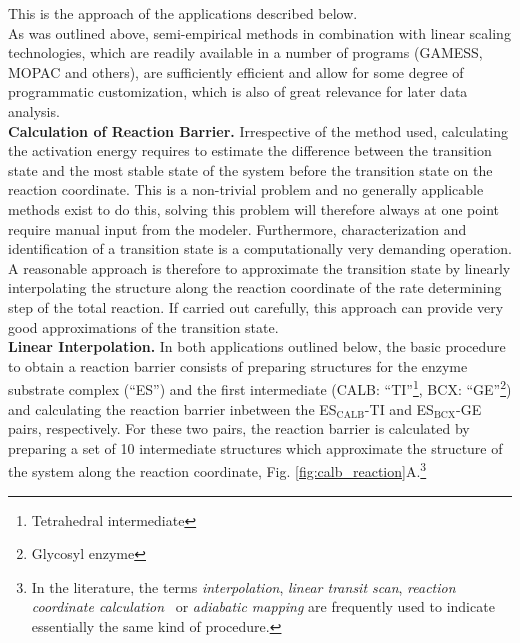 This is the approach of the applications described below.\\
As was outlined above, semi-empirical methods in combination with linear scaling technologies, which are readily available in a number of programs (GAMESS, MOPAC and others), are sufficiently efficient and allow for some degree of programmatic customization, which is also of great relevance for later data analysis.\\
\textbf{Calculation of Reaction Barrier.}
Irrespective of the method used, calculating the activation energy requires to estimate the difference between the transition state and the most stable state of the system before the transition state on the reaction coordinate.
This is a non-trivial problem and no generally applicable methods exist to do this, solving this problem will therefore always at one point require manual input from the modeler.
Furthermore, characterization and identification of a transition state is a computationally very demanding operation.
A reasonable approach is therefore to approximate the transition state by linearly interpolating the structure along the reaction coordinate of the rate determining step of the total reaction.
If carried out carefully, this approach can provide very good approximations of the transition state.\\
\textbf{Linear Interpolation.}
In both applications outlined below, the basic procedure to obtain a reaction barrier consists of preparing structures for the enzyme substrate complex (``ES'') and the first intermediate (CALB: ``TI''\footnote{Tetrahedral intermediate}, BCX: ``GE''\footnote{\label{foot:ge}Glycosyl enzyme}) and calculating the reaction barrier inbetween the ES$_\text{CALB}$-TI and ES$_\text{BCX}$-GE pairs, respectively.
For these two pairs, the reaction barrier is calculated by preparing a set of 10 intermediate structures which approximate the structure of the system along the reaction coordinate, Fig. \ref{fig:calb_reaction}A.\footnote{In the literature, the terms \textit{interpolation}, \textit{linear transit scan}, \textit{reaction coordinate calculation } or \textit{adiabatic mapping} are frequently used to indicate essentially the same kind of procedure.}
